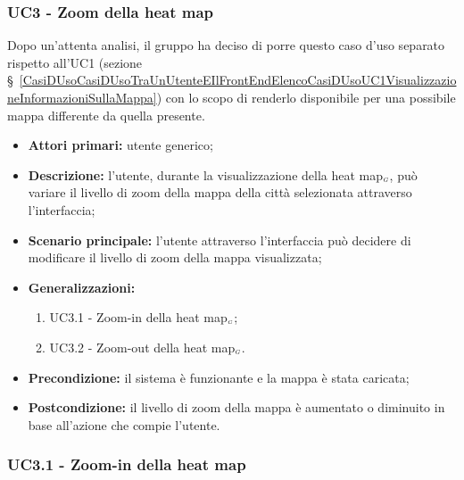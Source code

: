 \subsubsection{UC3 - Zoom della heat map}\label{CasiDUsoCasiDUsoTraUnUtenteEIlFrontEndElencoCasiDUsoUC3ZoomDellaHeatMap}

Dopo un'attenta analisi, il gruppo ha deciso di porre questo caso d'uso separato rispetto all'UC1 (sezione \S~\ref{CasiDUsoCasiDUsoTraUnUtenteEIlFrontEndElencoCasiDUsoUC1VisualizzazioneInformazioniSullaMappa}) con lo scopo di renderlo disponibile per una possibile mappa differente da quella presente.



\begin{itemize}
	\item \textbf{Attori primari:} utente generico;
	\item \textbf{Descrizione:} l’utente, durante la visualizzazione della heat map$_{\scaleto{G}{3pt}}$, può variare il livello di zoom della mappa della città selezionata attraverso l'interfaccia;
	\item \textbf{Scenario principale:} l’utente attraverso l'interfaccia può decidere di modificare il livello di zoom della mappa visualizzata;
	\item \textbf{Generalizzazioni:}\begin{enumerate}
		\item UC3.1 - Zoom-in della heat map$_{\scaleto{G}{3pt}}$;
		\item UC3.2 - Zoom-out della heat map$_{\scaleto{G}{3pt}}$.
	\end{enumerate}
	\item \textbf{Precondizione:} il sistema è funzionante e la mappa è stata caricata;
	\item \textbf{Postcondizione:} il livello di zoom della mappa è aumentato o diminuito in base all'azione che compie l'utente.
\end{itemize}

\subsubsection{UC3.1 - Zoom-in della heat map}\label{CasiDUsoCasiDUsoTraUnUtenteEIlFrontEndElencoCasiDUsoUC31ZoomInDellaHeatMap}


